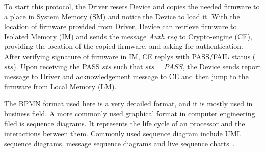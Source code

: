 \documentclass[12pt,frontmatter,copyright,thesis]{usfmanus}
\begin{document}
To start this protocol, the Driver resets Device and copies the needed
firmware to a place in System Memory (SM) and notice the Device to load it. With the location of firmware
provided from Driver, Device can retrieve firmware to Isolated Memory (IM) and sends the message $Auth\_req $
to Crypto-engine (CE), providing the location of the copied firmware, and asking for authentication. After verifying 
signature of firmware in IM, CE replys with 
PASS/FAIL status ($sts$). 
Upon receiving the PASS $sts$ such that $sts=PASS$, the Device sends report message to Driver and acknowledgement message
to CE and then jump to the firmware from Local Memory (LM).

The BPMN format used here is a very detailed format, and it is mostly
used in business field. 
A more commonly used graphical format in computer
engineering filed is sequence diagrams.
It represents the
 life cycle of an processor and the interactions between them.
Commonly used sequence diagram include UML sequence diagrams, message sequence 
diagrams and live sequence charts~\cite{lsctocpn}.
 
\end{document}
